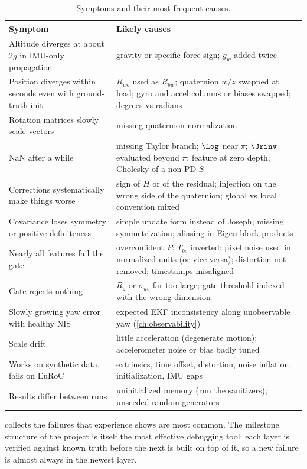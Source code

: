 \begin{table}[t]
\centering\small
\begin{tabularx}{\textwidth}{@{}>{\raggedright\arraybackslash}p{4.4cm} X@{}}
\toprule
\textbf{Symptom} & \textbf{Likely causes} \\
\midrule
Altitude diverges at about $2g$ in IMU-only propagation & gravity or specific-force sign; $g_w$ added twice \\
Position diverges within seconds even with ground-truth init & $R_{wb}$ used as $R_{bw}$; quaternion $w/z$ swapped at load; gyro and accel columns or biases swapped; degrees vs radians \\
Rotation matrices slowly scale vectors & missing quaternion normalization \\
NaN after a while & missing Taylor branch; $\Log$ near $\pi$; $\Jrinv$ evaluated beyond $\pi$; feature at zero depth; Cholesky of a non-PD $S$ \\
Corrections systematically make things worse & sign of $H$ or of the residual; injection on the wrong side of the quaternion; global vs local convention mixed \\
Covariance loses symmetry or positive definiteness & simple update form instead of Joseph; missing symmetrization; aliasing in Eigen block products \\
Nearly all features fail the gate & overconfident $P$; $T_{bc}$ inverted; pixel noise used in normalized units (or vice versa); distortion not removed; timestamps misaligned \\
Gate rejects nothing & $R_z$ or $\sigma_{uv}$ far too large; gate threshold indexed with the wrong dimension \\
Slowly growing yaw error with healthy NIS & expected EKF inconsistency along unobservable yaw (\cref{ch:observability}) \\
Scale drift & little acceleration (degenerate motion); accelerometer noise or bias badly tuned \\
Works on synthetic data, fails on EuRoC & extrinsics, time offset, distortion, noise inflation, initialization, IMU gaps \\
Results differ between runs & uninitialized memory (run the sanitizers); unseeded random generators \\
\bottomrule
\end{tabularx}
\caption{Symptoms and their most frequent causes.}
\label{tab:debugging}
\end{table}

 collects the failures that experience shows are most common. The milestone structure of the project is itself
the most effective debugging tool: each layer is verified against known truth before the next is built on top of it, so a new
failure is almost always in the newest layer.

